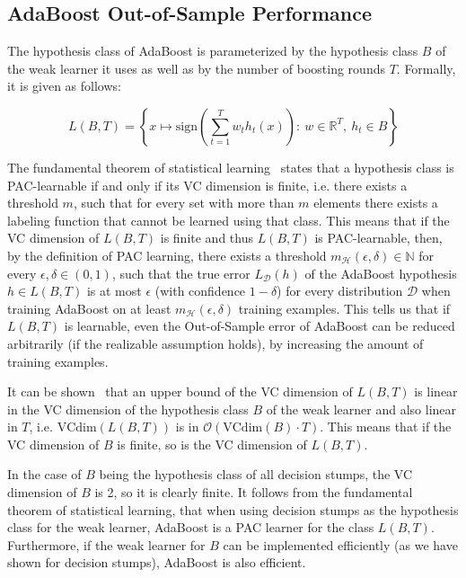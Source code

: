\subsection{AdaBoost Out-of-Sample Performance}
\label{sec:vcdim}

The hypothesis class of AdaBoost is parameterized by the hypothesis class $B$ of the weak learner it uses as well as by
the number of boosting rounds $T$. Formally, it is given as follows:
\begin{linenomath*}
    $$
    L(B, T) = \left \{ x \mapsto \text{sign} \left( \sum_{t=1}^T w_t h_t(x) \right): \ 
        w \in \mathbb{R}^T, \  h_t \in B \right \}
    $$
\end{linenomath*}

The fundamental theorem of statistical learning~\cite[chapter 6]{SSBD14} states that a hypothesis class is PAC-learnable
if and only if its VC dimension is finite, i.e. there exists a threshold $m$, such that for every set with more than
$m$ elements there exists a labeling function that cannot be learned using that class.
This means that if the VC dimension of $L(B, T)$ is finite and thus $L(B, T)$ is PAC-learnable, then, by the definition
of PAC learning, there exists a threshold 
$m_\mathcal{H}(\epsilon, \delta) \in \mathbb{N}$ for every $\epsilon, \delta \in (0, 1)$, 
such that the true error $L_\mathcal{D}(h)$ of the AdaBoost hypothesis $h \in L(B, T)$ is at most $\epsilon$
(with confidence $1-\delta$)
for every distribution $\mathcal{D}$ when training AdaBoost on at least $m_\mathcal{H}(\epsilon, \delta)$ training
examples. This tells us that if $L(B, T)$ is learnable, even the Out-of-Sample error of AdaBoost can be reduced
arbitrarily (if the realizable assumption holds), by increasing the amount of training examples.

It can be shown~\cite{SSBD14} that an upper bound of the VC dimension of $L(B, T)$ 
is linear in the VC dimension of the hypothesis
class $B$ of the weak learner and also linear in $T$, i.e. $\text{VCdim}(L(B, T))$ is in
$\mathcal{O}(\text{VCdim}(B) \cdot T)$.
This means that if the VC dimension of $B$ is finite, so is the VC dimension of $L(B, T)$.

In the case of $B$ being the hypothesis class of all decision stumps, the VC dimension of $B$ is 2,
so it is clearly finite.
It follows from the fundamental theorem of statistical learning, that when using decision stumps as the hypothesis
class for the weak learner, AdaBoost is a PAC learner for the class $L(B, T)$.
Furthermore, if the weak learner for $B$ can be implemented efficiently (as we have shown for decision stumps), AdaBoost
is also efficient.

